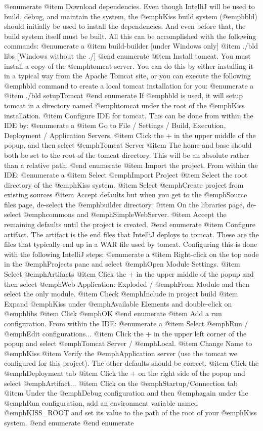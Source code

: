 @enumerate
@item
Download dependencies.  Even though IntelliJ will be used to build,
debug, and maintain the system, the @emph{Kiss} build system
(@emph{bld}) should initially be used to install the dependencies.
And even before that, the build system itself must be built.  All this
can be accomplished with the following commands:
@enumerate a
@item
build-builder                [under Windows only]
@item
./bld libs                   [Windows without the ./]
@end enumerate
@item
Install tomcat.  You must install a copy of the @emph{tomcat} server.
You can do this by either installing it in a typical way from the
Apache Tomcat site, or you can execute the following @emph{bld}
command to create a local tomcat installation for you:
@enumerate a
@item
./bld setupTomcat
@end enumerate
If @emph{bld} is used, it will setup tomcat in a directory named
@emph{tomcat} under the root of the @emph{Kiss} installation.
@item
Configure IDE for tomcat.  This can be done from within the IDE by:
@enumerate a
@item
Go to File / Settings / Build, Execution, Deployment / Application Servers.
@item
Click the + in the upper middle of the popup, and then select @emph{Tomcat Server}
@item
The home and base should both be set to the root of the tomcat directory.  This
will be an absolute rather than a relative path.
@end enumerate
@item
Import the project.  From within the IDE:
@enumerate a
@item
Select @emph{Import Project}
@item
Select the root directory of the @emph{Kiss} system.
@item
Select @emph{Create project from existing sources}
@item
Accept defaults but when you get to the @emph{Source files} page, de-select the 
@emph{builder} directory.
@item
On the libraries page, de-select @emph{commons} and @emph{SimpleWebServer}.
@item
Accept the remaining defaults until the project is created.
@end enumerate
@item
Configure artifact.  The artifact is the end files that IntelliJ deploys to tomcat.  
These are the files that typically end up in a WAR file used by tomcat.  Configuring
this is done with the following IntelliJ steps:
@enumerate a
@item
Right-click on the top node in the @emph{Projects} pane and select
@emph{Open Module Settings}.
@item
Select @emph{Artifacts}
@item
Click the + in the upper middle of the popup and then select @emph{Web
Application: Exploded} / @emph{From Module} and then select the only module.
@item
Check @emph{Include in project build}
@item
Expand @emph{Kiss} under @emph{Available Elements} and double-click on @emph{libs}
@item
Click @emph{OK}
@end enumerate
@item
Add a run configuration.  From within the IDE:
@enumerate a
@item
Select @emph{Run} / @emph{Edit configurations...}
@item
Click the + in the upper left corner of the popup and select @emph{Tomcat Server} / 
@emph{Local}.
@item
Change Name to @emph{Kiss}
@item
Verify the @emph{Application server} (use the tomcat we configured for this project).
The other defaults should be correct.
@item
Click the @emph{Deployment} tab
@item
Click the + on the right side of the popup and select @emph{Artifact...}
@item
Click on the @emph{Startup/Connection} tab
@item
Under the @emph{Debug} configuration and then @emph{again} under the
@emph{Run} configuration, add an environment variable named
@emph{KISS_ROOT} and set its value to the path of the root of your
@emph{Kiss} system.
@end enumerate
@end enumerate

